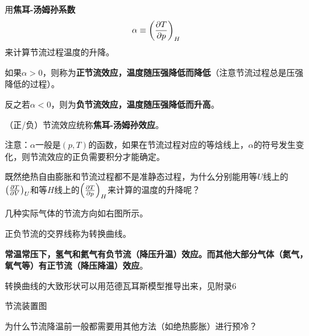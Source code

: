 \documentclass[CJK]{beamer}
\begin{document}
\begin{frame}
\bch

\bitem
\item{用{\bf 焦耳-汤姆孙系数$$\alpha \equiv \left(\frac{\partial T}{\partial p}\right)_{H}$$}来计算节流过程温度的升降。}
\item{如果$\alpha>0$，则称为{\bf 正节流效应，温度随压强降低而降低}（注意节流过程总是压强降低的过程）。}
\item{反之若$\alpha<0$，则为{\bf 负节流效应，温度随压强降低而升高}。}
\item{（正/负）节流效应统称{\bf 焦耳-汤姆孙效应}。}
\eitem



\skiplines

{\scriptsize 注意：$\alpha$一般是$(p,T)$的函数，如果在节流过程对应的等焓线上，$\alpha$的符号发生变化，则节流效应的正负需要积分才能确定。}
\ech
\end{frame}

\begin{frame}
\bch

既然绝热自由膨胀和节流过程都不是准静态过程，为什么分别能用等$U$线上的$\left(\frac{\partial T}{\partial V}\right)_{U}$和等$H$线上的$\left(\frac{\partial T}{\partial p}\right)_{H}$来计算的温度的升降呢？
\ech
\end{frame}

\begin{frame}
\bch

几种实际气体的节流方向如右图所示。

\skipline

正负节流的交界线称为转换曲线。

\skipline
    {\bf 常温常压下，氢气和氦气有负节流（降压升温）效应。而其他大部分气体（氮气，氧气等）有正节流（降压降温）效应}。

    \skipline
    
    {\scriptsize 转换曲线的大致形状可以用范德瓦耳斯模型推导出来，见附录6}
\emini
{}
\emini



\ech
\end{frame}

\begin{frame}
\bch
{}
\emini
{}
节流装置图
\emini

\ech
\end{frame}


\begin{frame}
\bchL
为什么节流降温前一般都需要用其他方法（如绝热膨胀）进行预冷？
\echL
\end{frame}
\end{document}
